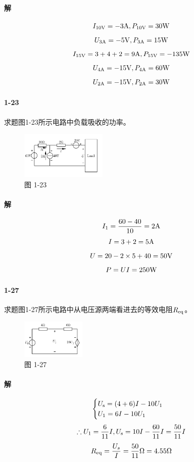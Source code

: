 \documentclass[hyperref, UTF8]{ctexart}
\begin{document}
\paragraph{解}
$$ I_{10 \rm V}=-3{\rm A}, P_{10 \rm V}=30{\rm W} $$
$$ U_{3 \rm A}=-5{\rm V}, P_{3 \rm A}=15{\rm W} $$
$$ I_{15 \rm V}=3+4+2=9{\rm A}, P_{15 \rm V}=-135{\rm W} $$
$$ U_{4 \rm A}=-15{\rm V}, P_{4 \rm A}=60{\rm W} $$
$$ U_{2 \rm A}=-15{\rm V}, P_{2 \rm A}=30{\rm W} $$

\paragraph{1-23}\label{1-23}
求题图1-23所示电路中负载吸收的功率。

\begin{figure}[!htb]
  \centering
  \includegraphics[width=0.365\textwidth]{p1-23.png}
  \caption*{图 1-23}
\end{figure}

\paragraph{解}
$$I_1=\frac{60-40}{10}=2{\rm A} $$
$$I=3+2=5{\rm A}$$
$$U=20-2\times 5+40=50{\rm V}$$
$$P=UI=250{\rm W} $$

\paragraph{1-27}\label{1-27}
求题图1-27所示电路中从电压源两端看进去的等效电阻$R_{\rm eq}$。

\begin{figure}[!htb]
  \centering
  \includegraphics[width=0.271\textwidth]{p1-27.png}
  \caption*{图 1-27}
\end{figure}

\paragraph{解}
$$
    \begin{cases}
    U_{\rm s} = (4+6)I-10U_1 \\
    U_1 = 6I - 10U_1
    \end{cases}
$$
$$
    \therefore U_1=\frac{6}{11}I,
    U_{\rm s}=10I-\frac{60}{11}I = \frac{50}{11}I
$$
$$
    R_{\rm eq}=\frac{U_s}{I}=\frac{50}{11}\Omega=4.55\Omega
$$
\end{document}
